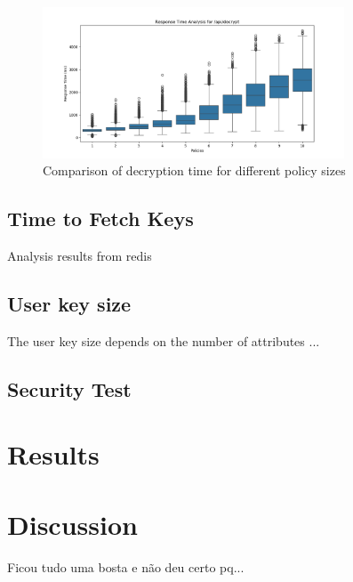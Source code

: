 \documentclass[cic,tc,english]{iiufrgs}
\begin{document}
                \begin{figure}
                    \centering
                    \includegraphics[width=0.8\textwidth]{images/phase4/response_time_api_decrypt.png}
                    \caption{Comparison of decryption time for different policy sizes}
                    \label{fig:decrypt_policy_size}
                \end{figure}

        \subsection{Time to Fetch Keys}
            \label{sec:timefetchkeys}
            Analysis results from redis

        \subsection{User key size}
            \label{sec:keysize}
            The user key size depends on the number of attributes ...


        

        \subsection{Security Test}
            \label{sec:securitytest}

    \section{Results}
        \label{sec:results}

    \section{Discussion}
        \label{sec:discussion}
        Ficou tudo uma bosta e não deu certo pq...
\end{document}
